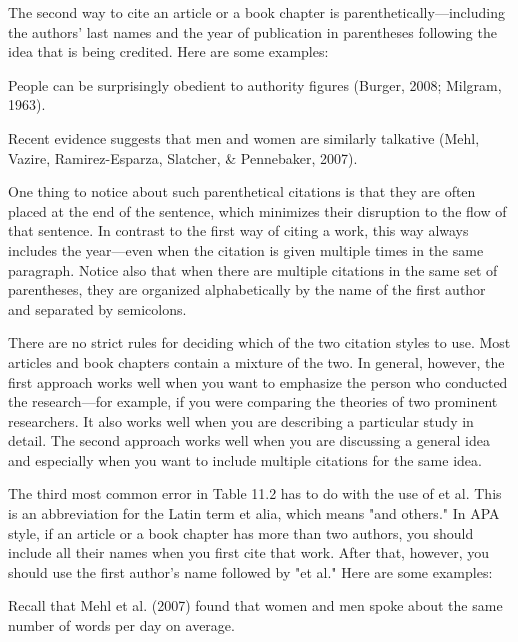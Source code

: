 The second way to cite an article or a book chapter is parenthetically---including the authors' last names and the year of publication in parentheses following the idea that is being credited. Here are some examples:


\begin{kframe}
People can be surprisingly obedient to authority figures (Burger, 2008; Milgram, 1963).

\end{kframe}

\begin{kframe}
Recent evidence suggests that men and women are similarly talkative (Mehl, Vazire, Ramirez-Esparza, Slatcher, \& Pennebaker, 2007).

\end{kframe}

One thing to notice about such parenthetical citations is that they are often placed at the end of the sentence, which minimizes their disruption to the flow of that sentence. In contrast to the first way of citing a work, this way always includes the year---even when the citation is given multiple times in the same paragraph. Notice also that when there are multiple citations in the same set of parentheses, they are organized alphabetically by the name of the first author and separated by semicolons.


There are no strict rules for deciding which of the two citation styles to use. Most articles and book chapters contain a mixture of the two. In general, however, the first approach works well when you want to emphasize the person who conducted the research---for example, if you were comparing the theories of two prominent researchers. It also works well when you are describing a particular study in detail. The second approach works well when you are discussing a general idea and especially when you want to include multiple citations for the same idea.


The third most common error in Table 11.2 has to do with the use of et al. This is an abbreviation for the Latin term et alia, which means "and others." In APA style, if an article or a book chapter has more than two authors, you should include all their names when you first cite that work. After that, however, you should use the first author's name followed by "et al." Here are some examples:


\begin{kframe}
Recall that Mehl et al. (2007) found that women and men spoke about the same number of words per day on average.

\end{kframe}

